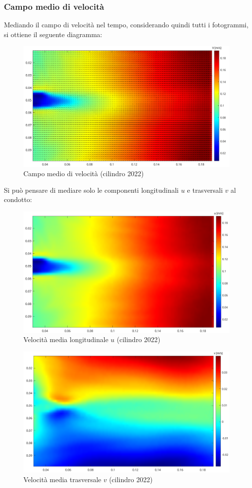 \subsubsection{Campo medio di velocità}
Mediando il campo di velocità nel tempo, considerando quindi tutti i fotogrammi, si ottiene il seguente diagramma:
\begin{figure}[H]
    \centering
    \includegraphics[width=.9\textwidth]{images/11/mean.png}
    \caption{Campo medio di velocità (cilindro 2022)}
\end{figure}

\noindent Si può pensare di mediare solo le componenti longitudinali $u$ e trasversali $v$ al condotto:
\begin{figure}[H]
    \centering
    \includegraphics[width=.9\textwidth]{images/11/Umean.png}
    \caption{Velocità media longitudinale $u$ (cilindro 2022)}
\end{figure}

\begin{figure}[H]
    \centering
    \includegraphics[width=.9\textwidth]{images/11/vmean.png}
    \caption{Velocità media trasversale $v$ (cilindro 2022)}
\end{figure}

